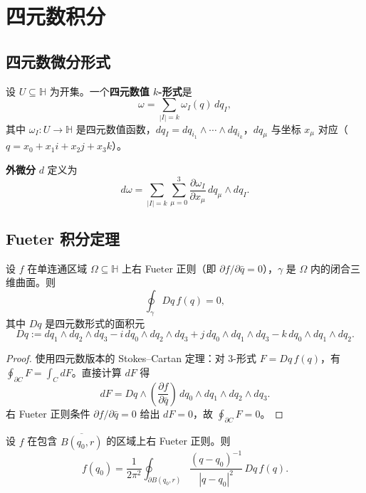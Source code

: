 \section{四元数积分}

\subsection{四元数微分形式}

\begin{definition}[四元数值微分形式]\label{def:q_differential_forms}
设 $U\subseteq\mathbb{H}$ 为开集。一个\textbf{四元数值 $k$-形式}是
\[
\omega=\sum_{|I|=k} \omega_I(q)\,dq_I,
\]
其中 $\omega_I:U\to\mathbb{H}$ 是四元数值函数，$dq_I=dq_{i_1}\wedge\cdots\wedge dq_{i_k}$，$dq_\mu$ 与坐标 $x_\mu$ 对应（$q=x_0+x_1i+x_2j+x_3k$）。
\end{definition}

\begin{definition}[外微分]\label{def:q_exterior_derivative}
\textbf{外微分} $d$ 定义为
\[
d\omega=\sum_{|I|=k}\sum_{\mu=0}^3 \frac{\partial \omega_I}{\partial x_\mu}\,dq_\mu\wedge dq_I.
\]
\end{definition}

\subsection{Fueter 积分定理}

\begin{theorem}\label{thm:q_cauchy_fueter}
设 $f$ 在单连通区域 $\Omega\subseteq\mathbb{H}$ 上右 Fueter 正则（即 $\partial f/\partial \bar q=0$），$\gamma$ 是 $\Omega$ 内的闭合三维曲面。则
\[
\oint_\gamma Dq\,f(q)=0,
\]
其中 $Dq$ 是四元数形式的面积元
\[
Dq:=dq_1\wedge dq_2\wedge dq_3
-i\,dq_0\wedge dq_2\wedge dq_3
+j\,dq_0\wedge dq_1\wedge dq_3
-k\,dq_0\wedge dq_1\wedge dq_2.
\]
\end{theorem}

\begin{proof}
使用四元数版本的 Stokes--Cartan 定理：对 3-形式 $F=Dq\,f(q)$，有 $\oint_{\partial C}F=\int_C dF$。直接计算 $dF$ 得
\[
dF=Dq\wedge\left(\frac{\partial f}{\partial \bar q}\right)\,dq_0\wedge dq_1\wedge dq_2\wedge dq_3.
\]
右 Fueter 正则条件 $\partial f/\partial \bar q=0$ 给出 $dF=0$，故 $\oint_{\partial C}F=0$。
\end{proof}

\begin{corollary}\label{cor:q_cauchy_formula}
设 $f$ 在包含 $\overline{B(q_0,r)}$ 的区域上右 Fueter 正则。则
\[
f(q_0)=\frac{1}{2\pi^2}\oint_{\partial B(q_0,r)} \frac{(q-q_0)^{-1}}{|q-q_0|^2}\,Dq\,f(q).
\]
\end{corollary}

